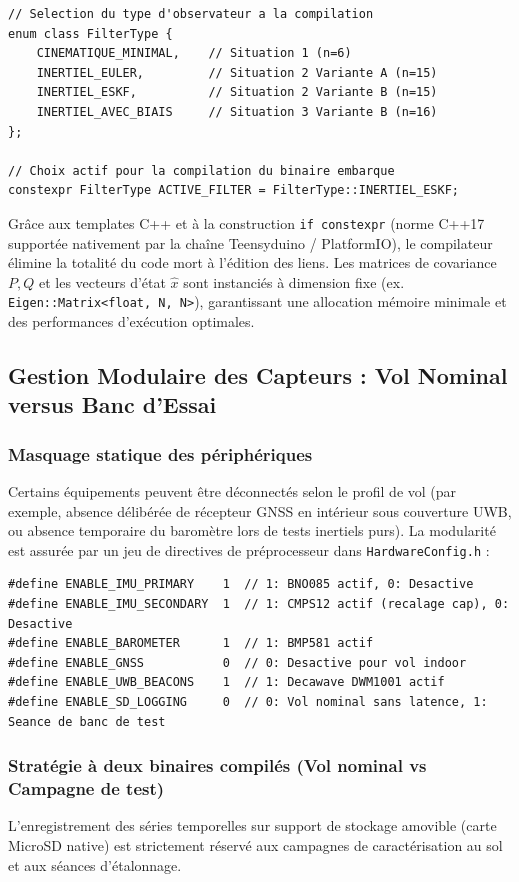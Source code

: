 \documentclass[../Implementation.tex]{subfiles}
\begin{document}
\begin{lstlisting}
// Selection du type d'observateur a la compilation
enum class FilterType {
    CINEMATIQUE_MINIMAL,    // Situation 1 (n=6)
    INERTIEL_EULER,         // Situation 2 Variante A (n=15)
    INERTIEL_ESKF,          // Situation 2 Variante B (n=15)
    INERTIEL_AVEC_BIAIS     // Situation 3 Variante B (n=16)
};

// Choix actif pour la compilation du binaire embarque
constexpr FilterType ACTIVE_FILTER = FilterType::INERTIEL_ESKF;
\end{lstlisting}

Grâce aux templates C++ et à la construction \lstinline|if constexpr| (norme C++17 supportée nativement par la chaîne Teensyduino / PlatformIO), le compilateur élimine la totalité du code mort à l'édition des liens. Les matrices de covariance $P, Q$ et les vecteurs d'état $\hat{x}$ sont instanciés à dimension fixe (ex. \lstinline|Eigen::Matrix<float, N, N>|), garantissant une allocation mémoire minimale et des performances d'exécution optimales.

\subsection{Gestion Modulaire des Capteurs : Vol Nominal versus Banc d'Essai}

\subsubsection{Masquage statique des périphériques}
Certains équipements peuvent être déconnectés selon le profil de vol (par exemple, absence délibérée de récepteur GNSS en intérieur sous couverture UWB, ou absence temporaire du baromètre lors de tests inertiels purs). La modularité est assurée par un jeu de directives de préprocesseur dans \lstinline|HardwareConfig.h| :

\begin{lstlisting}
#define ENABLE_IMU_PRIMARY    1  // 1: BNO085 actif, 0: Desactive
#define ENABLE_IMU_SECONDARY  1  // 1: CMPS12 actif (recalage cap), 0: Desactive
#define ENABLE_BAROMETER      1  // 1: BMP581 actif
#define ENABLE_GNSS           0  // 0: Desactive pour vol indoor
#define ENABLE_UWB_BEACONS    1  // 1: Decawave DWM1001 actif
#define ENABLE_SD_LOGGING     0  // 0: Vol nominal sans latence, 1: Seance de banc de test
\end{lstlisting}

\subsubsection{Stratégie à deux binaires compilés (Vol nominal vs Campagne de test)}
L'enregistrement des séries temporelles sur support de stockage amovible (carte MicroSD native) est strictement réservé aux campagnes de caractérisation au sol et aux séances d'étalonnage. 
\end{document}
